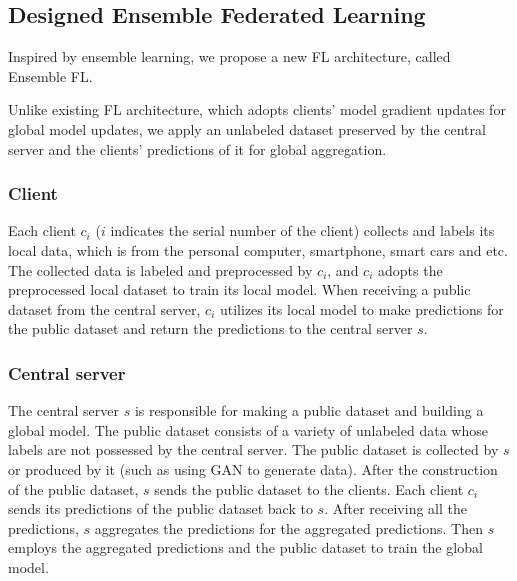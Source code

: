 \documentclass[journal]{IEEEtran}
\begin{document}
\subsection{Designed Ensemble Federated Learning}
Inspired by ensemble learning, we propose a new FL architecture, called Ensemble FL.
\par Unlike existing FL architecture, which adopts clients' model gradient updates for global model updates, we apply an unlabeled dataset preserved by the central server and the clients' predictions of it for global aggregation.
\subsubsection{{Client}} Each client {$c_{i}$} ($i$ indicates the serial number of the client) collects and labels its local data, which is from the personal computer, smartphone, smart cars and etc. The collected data is labeled and preprocessed by {$c_{i}$}, and {$c_{i}$} adopts the preprocessed local dataset to train its local model. When receiving a public dataset from the central server, {$c_{i}$} utilizes its local model to make predictions for the public dataset and return the predictions to the central server {$s$}.
\subsubsection{{Central server}} The central server {$s$} is responsible for making a public dataset and building a global model. The public dataset consists of a variety of unlabeled data whose labels are not possessed by the central server. The public dataset is collected by {$s$} or produced by it (such as using GAN to generate data). After the construction of the public dataset, {$s$} sends the public dataset to the clients. Each client {$c_{i}$} sends its predictions of the public dataset back to {$s$}. After receiving all the predictions, {$s$} aggregates the predictions for the aggregated predictions. Then {$s$} employs the aggregated predictions and the public dataset to train the global model.
\end{document}
